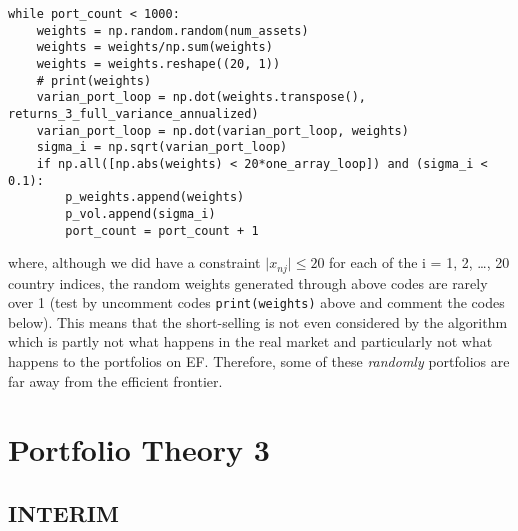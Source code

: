 \documentclass[
]{article}
\begin{document}
\begin{verbatim}
while port_count < 1000:
    weights = np.random.random(num_assets)
    weights = weights/np.sum(weights)
    weights = weights.reshape((20, 1))
    # print(weights)
    varian_port_loop = np.dot(weights.transpose(), returns_3_full_variance_annualized)
    varian_port_loop = np.dot(varian_port_loop, weights)
    sigma_i = np.sqrt(varian_port_loop)
    if np.all([np.abs(weights) < 20*one_array_loop]) and (sigma_i < 0.1): 
        p_weights.append(weights) 
        p_vol.append(sigma_i)
        port_count = port_count + 1
\end{verbatim}

where, although we did have a constraint \(\mid{x_{nj}}\mid\leq20\) for
each of the i = 1, 2, \ldots, 20 country indices, the random weights
generated through above codes are rarely over 1 (test by uncomment codes
\texttt{print(weights)} above and comment the codes below). This means
that the short-selling is not even considered by the algorithm which is
partly not what happens in the real market and particularly not what
happens to the portfolios on EF. Therefore, some of these
\emph{randomly} portfolios are far away from the efficient frontier.

\hypertarget{portfolio-theory-3}{%
\section{Portfolio Theory 3}\label{portfolio-theory-3}}

\hypertarget{interim}{%
\subsection{INTERIM}\label{interim}}
\end{document}

